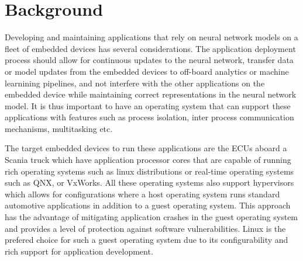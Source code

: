




\chapter{Background}

Developing and maintaining applications that rely on neural network models on a fleet of embedded devices has several considerations. The application deployment process should allow for continuous updates to the neural network, transfer data or model updates from the embedded devices to off-board analytics or machine learnining pipelines, and not interfere with the other applications on the embedded device while maintaining correct representations in the neural network model. It is thus important to have an operating system that can support these applications with features such as process isolation, inter process communication mechanisms, multitasking etc.

The target embedded devices to run these applications are the ECUs aboard a Scania truck which have application processor cores that are capable of running rich operating systems such as linux distributions or real-time operating systems such as QNX, or VxWorks. All these operating systems also support hypervisors which allows for configurations where a host operating system runs standard automotive applications in addition to a guest operating system. This approach has the advantage of mitigating application crashes in the guest operating system and provides a level of protection against software vulnerabilities. Linux is the prefered choice for such a guest operating system due to its configurability and rich support for application development.

